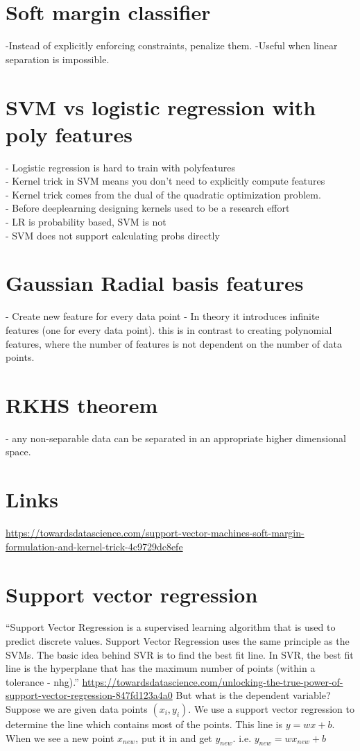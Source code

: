 \documentclass{article}
\begin{document}
\section{Soft margin classifier}
-Instead of explicitly enforcing constraints, penalize them.
-Useful when linear separation is impossible.

\section{SVM vs logistic regression with poly features}
- Logistic regression is hard to train with polyfeatures\\
- Kernel trick in SVM means you don't need to explicitly compute features\\
- Kernel trick comes from the dual of the quadratic optimization problem.\\
- Before deeplearning designing kernels used to be a research effort\\
- LR is probability based, SVM is not\\
- SVM does not support calculating probs directly\\

\section{Gaussian Radial basis features}
- Create new feature for every data point
- In theory it introduces infinite features (one for every data point). this is in contrast to creating polynomial features, where the number of features is not dependent on the number of data points.

\section{RKHS theorem}
- any non-separable data can be separated in an appropriate higher dimensional space.

\section{Links}
\url{https://towardsdatascience.com/support-vector-machines-soft-margin-formulation-and-kernel-trick-4c9729dc8efe}

\section{Support vector regression}
``Support Vector Regression is a supervised learning algorithm that is used to predict discrete values. Support Vector Regression uses the same principle as the SVMs. The basic idea behind SVR is to find the best fit line. In SVR, the best fit line is the hyperplane that has the maximum number of points (within a tolerance - nhg).'' \url{https://towardsdatascience.com/unlocking-the-true-power-of-support-vector-regression-847fd123a4a0} But what is the dependent variable? Suppose we are given data points $(x_i,y_i)$. We use a support vector regression to determine the line which contains most of the points. This line is $y=wx+b$. When we see a new point $x_{new}$, put it in and get $y_{new}$. i.e. $y_{new} = wx_{new}+b$
\end{document}
